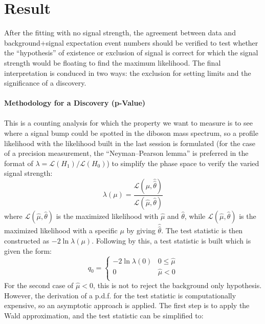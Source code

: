 \section{Result}
\label{Sec:lvqq_result}
After the fitting with no signal strength, the agreement between data and background+signal expectation event numbers should be verified to test whether the ``hypothesis'' of existence or exclusion of signal is correct for which the signal strength would be floating to find the maximum likelihood. The final interpretation is conduced in two ways: the exclusion for setting limits and the significance of a discovery. 
\\
\\{\bf Methodology for a Discovery (p-Value)}
\\
\\This is a counting analysis for which the property we want to measure is to see where a signal bump could be spotted in the diboson mass spectrum, so a profile likelihood with the likelihood built in the last session is formulated\cite{profile1,profile2} (for the case of a precision measurement, the ``Neyman–Pearson lemma'' is preferred in the format of $\lambda=\mathcal{L}(H_{1})/\mathcal{L}(H_0)$\cite{pn}) to simplify the phase space to verify the varied signal strength:
\begin{equation}
\lambda(\mu) = \frac{\mathcal{L}(\mu,\hat{\hat{\theta}})}{\mathcal{L}(\hat{\mu},\hat{\theta})}
\end{equation}
where $\mathcal{L}(\hat{\mu},\hat{\theta})$ is the maximized likelihood with $\hat{\mu}$ and $\hat{\theta}$, while $\mathcal{L}(\hat{\mu},\hat{\theta})$ is the maximized likelihood with a specific $\mu$ by giving $\hat{\hat{\theta}}$. The test statistic is then constructed as $-2\ln{\lambda(\mu)}$. Following by this, a test statistic\cite{teststats} is built which is given the form:
\begin{equation}
\label{Eq:testPvalue}
q_{0} = 
\begin{cases}
-2 \ln \lambda(0) & 0 \le \hat{\mu} \\
0 & \hat{\mu} < 0 \\
\end{cases}
\end{equation}
\noindent
For the second case of $\hat{\mu}<0$, this is not to reject the background only hypothesis. However, the derivation of a p.d.f. for the test statistic is computationally expensive, so an asymptotic approach is applied. The first step is to apply the Wald approximation, and the test statistic can be simplified to:
